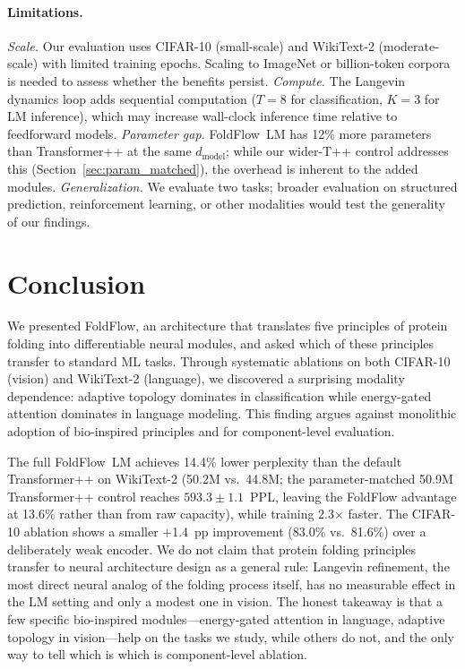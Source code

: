 \documentclass[10pt]{article}
\begin{document}
\paragraph{Limitations.}
\emph{Scale.}  Our evaluation uses CIFAR-10 (small-scale) and WikiText-2
(moderate-scale) with limited training epochs.  Scaling to ImageNet or
billion-token corpora is needed to assess whether the benefits persist.
\emph{Compute.}  The Langevin dynamics loop adds sequential computation
($T{=}8$ for classification, $K{=}3$ for LM inference), which may
increase wall-clock inference time relative to feedforward models.
\emph{Parameter gap.}  FoldFlow~LM has 12\% more parameters than
Transformer++ at the same $d_\text{model}$; while our wider-T++ control
addresses this (Section~\ref{sec:param_matched}), the overhead
is inherent to the added modules.
\emph{Generalization.}  We evaluate two tasks; broader evaluation on
structured prediction, reinforcement learning, or other modalities
would test the generality of our findings.

\section{Conclusion}
\label{sec:conclusion}

We presented FoldFlow, an architecture that translates five principles
of protein folding into differentiable neural modules, and asked which
of these principles transfer to standard ML tasks.  Through systematic
ablations on both CIFAR-10 (vision) and WikiText-2 (language), we
discovered a surprising modality dependence: adaptive topology dominates
in classification while energy-gated attention dominates in language
modeling.  This finding argues against monolithic adoption of
bio-inspired principles and for component-level evaluation.

The full FoldFlow~LM achieves 14.4\% lower perplexity than the
default Transformer++ on WikiText-2 (50.2M vs.\ 44.8M; the
parameter-matched 50.9M Transformer++ control reaches
$593.3 \pm 1.1$~PPL, leaving the FoldFlow advantage at 13.6\% rather
than from raw capacity), while training 2.3$\times$ faster.  The
CIFAR-10 ablation shows a smaller +1.4~pp improvement (83.0\% vs.\
81.6\%) over a deliberately weak encoder.  We do not claim that
protein folding principles transfer to neural architecture design as a
general rule: Langevin refinement, the most direct neural analog of
the folding process itself, has no measurable effect in the LM setting
and only a modest one in vision.  The honest takeaway is that a few
specific bio-inspired modules---energy-gated attention in language,
adaptive topology in vision---help on the tasks we study, while others
do not, and the only way to tell which is which is component-level
ablation.
\end{document}

